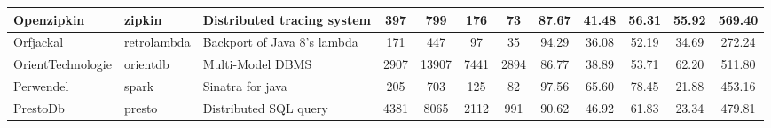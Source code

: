 \begin{table*}[]
{\begin{tabular}{lllccccccccc}
Openzipkin                  & zipkin                                                        & Distributed tracing system                                               & 397            & 799             & 176                                                              & 73             & 87.67          & 41.48          & 56.31          & 55.92                                                                                 & 569.40                                               \\ \hline
Orfjackal                   & retrolambda                                                   & Backport of Java 8's lambda                                              & 171            & 447             & 97                                                               & 35             & 94.29          & 36.08          & 52.19          & 34.69                                                                                 & 272.24                                               \\ \hline
OrientTechnologie           & orientdb                                                      & Multi-Model DBMS                                                         & 2907           & 13907           & 7441                                                             & 2894           & 86.77          & 38.89          & 53.71          & 62.20                                                                                 & 511.80                                               \\ \hline
Perwendel                   & spark                                                         & Sinatra  for java                                                        & 205            & 703             & 125                                                              & 82             & 97.56          & 65.60          & 78.45          & 21.88                                                                                 & 453.16                                               \\ \hline
PrestoDb                    & presto                                                        & Distributed SQL query                                                    & 4381           & 8065            & 2112                                                             & 991            & 90.62          & 46.92          & 61.83          & 23.34                                                                                 & 479.81                                               \\ \hline

\end{tabular}}
\end{table*}
